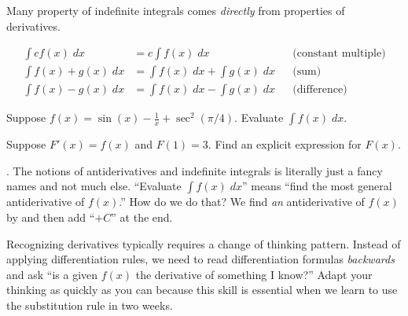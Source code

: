 \documentclass[../main.tex]{subfiles}
\begin{document}
  \clearpage
  Many property of indefinite integrals comes \emph{directly} from properties of derivatives.

  \begin{mdframed}[style=withref-compact]
    \begin{align*}
      \int c f(x) \;dx 
    &= c \int f(x) \;dx && \text{(constant multiple)}\\
    \int f(x) + g(x) \;dx 
    &= \int f(x) \;dx + \int g(x) \;dx && \text{(sum)}\\
    \int f(x) - g(x) \;dx 
    &= \int f(x) \;dx - \int g(x) \;dx && \text{(difference)}
    \end{align*}

  \end{mdframed}

  \begin{example}
    Suppose \(f(x) = \sin(x) - \frac{1}{x} + \sec^{2}(\pi/4)\). Evaluate \(\int f(x) \;dx\). 

    Suppose \(F'(x) = f(x)\) and \(F(1) = 3\). Find an explicit expression for \(F(x)\).

  \end{example}

  . The notions of antiderivatives and indefinite integrals is literally just a fancy names and not much else. ``Evaluate \(\textstyle \int f(x) \;dx\)'' means ``find the most general antiderivative of \(f(x)\).'' How do we do that? We find \emph{an} antiderivative of \(f(x)\) by  and then add ``\(+ C\)'' at the end.

  Recognizing derivatives typically requires a change of thinking pattern. Instead of applying differentiation rules, we need to read differentiation formulas \emph{backwards} and ask ``is a given \(f(x)\) the derivative of something I know?'' Adapt your thinking as quickly as you can because this skill is essential when we learn to use the substitution rule in two weeks.

  \clearpage
\end{document}
